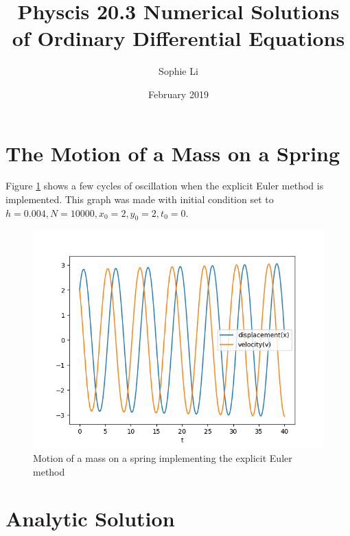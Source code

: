 \documentclass{article}
\title{Physcis 20.3 Numerical Solutions of Ordinary Differential Equations}
\author{Sophie Li}
\date{February 2019}
\begin{document}
\maketitle

\section{The Motion of a Mass on a Spring}
Figure \ref{fig:expliciteuler} shows a few cycles of oscillation when the explicit Euler method is implemented. This graph was made with initial condition set to $h=0.004, N=10000, x_0=2, y_0=2, t_0=0$.
\begin{figure}[h]
    \centering
    \includegraphics[width = \textwidth]{Images/expliciteuler.png}
    \caption{Motion of a mass on a spring implementing the explicit Euler method}
    \label{fig:expliciteuler}
\end{figure}

\section{Analytic Solution}
\end{document}
